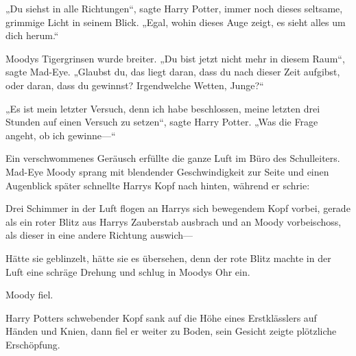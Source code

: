 „Du siehst in alle Richtungen“, sagte Harry Potter, immer noch dieses seltsame, grimmige Licht in seinem Blick. „Egal, wohin dieses Auge zeigt, es sieht alles um dich herum.“

Moodys Tigergrinsen wurde breiter. „Du bist jetzt nicht mehr in diesem Raum“, sagte Mad-Eye. „Glaubst du, das liegt daran, dass du nach dieser Zeit aufgibst, oder daran, dass du gewinnst? Irgendwelche Wetten, Junge?“

„Es ist mein letzter Versuch, denn ich habe beschlossen, meine letzten drei Stunden auf einen Versuch zu setzen“, sagte Harry Potter. „Was die Frage angeht, ob ich gewinne—“

Ein verschwommenes Geräusch erfüllte die ganze Luft im Büro des Schulleiters. Mad-Eye Moody sprang mit blendender Geschwindigkeit zur Seite und einen Augenblick später schnellte Harrys Kopf nach hinten, während er schrie: 

Drei Schimmer in der Luft flogen an Harrys sich bewegendem Kopf vorbei, gerade als ein roter Blitz aus Harrys Zauberstab ausbrach und an Moody vorbeischoss, als dieser in eine andere Richtung auswich—

Hätte sie geblinzelt, hätte sie es übersehen, denn der rote Blitz machte in der Luft eine schräge Drehung und schlug in Moodys Ohr ein.

Moody fiel.

Harry Potters schwebender Kopf sank auf die Höhe eines Erstklässlers auf Händen und Knien, dann fiel er weiter zu Boden, sein Gesicht zeigte plötzliche Erschöpfung.

